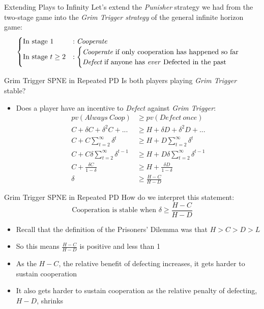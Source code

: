 \begin{frame}{Extending Plays to Infinity}
   Let's extend the \textit{Punisher} strategy we had from the two-stage game 
   into the \textit{Grim Trigger strategy} of the general infinite horizon game:
  \begin{align*}
    \begin{cases}
      \text{In stage } 1 & : \textit{Cooperate} \\ 
      \text{In stage } t \geq 2 & : 
      \begin{cases}
        \textit{Cooperate} \text{  if only cooperation has happened so far} \\ 
        \textit{Defect} \text{  if anyone has \textit{ever} Defected in the past}
      \end{cases}
    \end{cases}
  \end{align*}
\end{frame}

\begin{frame}{Grim Trigger SPNE in Repeated PD}
  Is both players playing \textit{Grim Trigger} stable?
  \begin{itemize}
    \item Does a player have an incentive to \textit{Defect} against \textit{Grim Trigger}:
    \vspace{-5mm}
    \begin{align*}
      pv(Always~Coop) & \geq pv(Defect~once) \\
      C + \delta C + \delta^2 C + ...      & \geq H + \delta D + \delta^2 D + ...\\
      C + C \sum_{t=2}^{\infty} \delta^{t} & \geq H + D \sum_{t=2}^{\infty} \delta^{t} \\ 
      C + C \delta \sum_{t=2}^{\infty} \delta^{t-1} & \geq H + D \delta \sum_{t=2}^{\infty} \delta^{t-1} \\ 
      C + \frac{\delta C}{1 - \delta} & \geq H + \frac{\delta D}{1 - \delta} \\
      \delta & \geq \frac{H - C}{H - D}
    \end{align*}
  \end{itemize}
\end{frame}

\begin{frame}{Grim Trigger SPNE in Repeated PD}
  How do we interpret this statement:
  $$\text{Cooperation is stable when } \delta \geq \frac{H - C}{H - D}  $$ 
  \begin{itemize}
    \item Recall that the definition of the Prisoners' Dilemma was that $H > C > D > L$
    \item So this means $\frac{H - C}{H - D}$ is positive and less than 1 
    \item As the $H - C$, the relative benefit of defecting increases,
    it gets harder to sustain cooperation
    \item It also gets harder to sustain cooperation as the relative penalty of defecting, $H - D$, shrinks 
  \end{itemize}
\end{frame}

